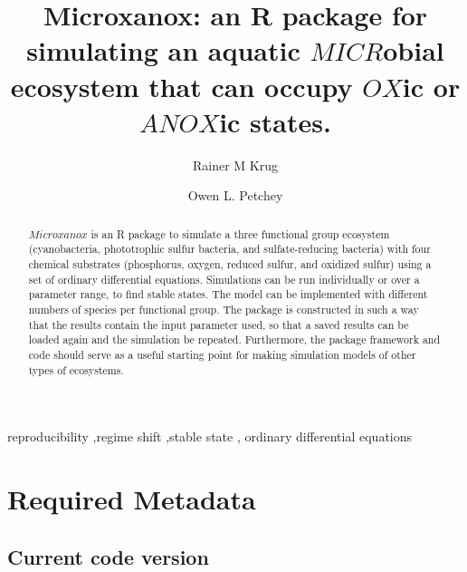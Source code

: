 \documentclass[preprint,12pt, a4paper]{elsarticle}
\begin{document}
\begin{frontmatter}

  \title{Microxanox: an R package for simulating an aquatic
\(MICR\)obial ecosystem that can occupy \(OX\)ic or \(ANOX\)ic states.}
    \author[University of Zürich]{Rainer M Krug%
  }
    \author[University of Zürich]{Owen L. Petchey%
  }
  
  \begin{abstract}
  \(Microxanox\) is an R package to simulate a three functional group
  ecosystem (cyanobacteria, phototrophic sulfur bacteria, and
  sulfate-reducing bacteria) with four chemical substrates (phosphorus,
  oxygen, reduced sulfur, and oxidized sulfur) using a set of ordinary
  differential equations. Simulations can be run individually or over a
  parameter range, to find stable states. The model can be implemented
  with different numbers of species per functional group. The package is
  constructed in such a way that the results contain the input parameter
  used, so that a saved results can be loaded again and the simulation
  be repeated. Furthermore, the package framework and code should serve
  as a useful starting point for making simulation models of other types
  of ecosystems.
  \end{abstract}
    \begin{keyword}
    reproducibility \sep regime shift \sep stable state \sep 
    ordinary differential equations
  \end{keyword}
  
 \end{frontmatter}

\pagebreak

\hypertarget{required-metadata}{%
\section{Required Metadata}\label{required-metadata}}

\hypertarget{current-code-version}{%
\subsection{Current code version}\label{current-code-version}}
\end{document}
